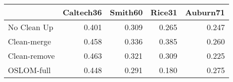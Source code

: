 \begin{tabular}{lrrrr}
\toprule
{} & Caltech36 & Smith60 & Rice31 & Auburn71 \\
\midrule
No Clean Up  &     0.401 &   0.309 &  0.265 &    0.247 \\
Clean-merge  &     0.458 &   0.336 &  0.385 &    0.260 \\
Clean-remove &     0.463 &   0.321 &  0.309 &    0.225 \\
OSLOM-full   &     0.448 &   0.291 &  0.180 &    0.275 \\
\bottomrule
\end{tabular}
